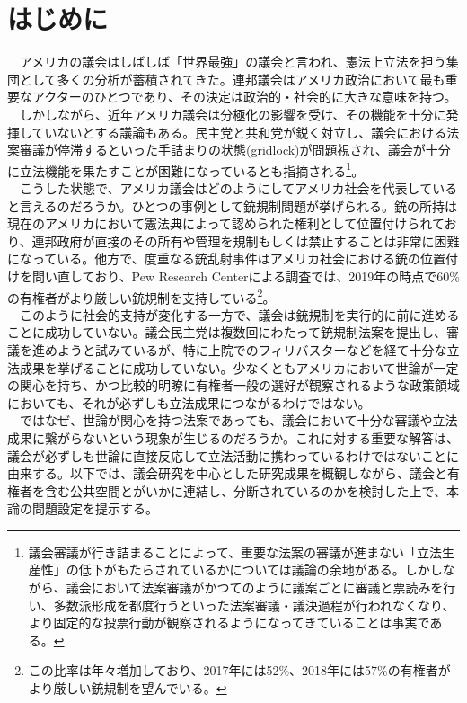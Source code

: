 \newpage
\section{はじめに}
　アメリカの議会はしばしば「世界最強」の議会\citep*{2004-cr}と言われ、憲法上立法を担う集団として多くの分析が蓄積されてきた。連邦議会はアメリカ政治において最も重要なアクターのひとつであり、その決定は政治的・社会的に大きな意味を持つ。\\
　しかしながら、近年アメリカ議会は分極化の影響を受け、その機能を十分に発揮していないとする議論もある。民主党と共和党が鋭く対立し、議会における法案審議が停滞するといった手詰まりの状態(gridlock)が問題視され、議会が十分に立法機能を果たすことが困難になっているとも指摘される\footnote{議会審議が行き詰まることによって、重要な法案の審議が進まない「立法生産性」の低下がもたらされているかについては議論の余地がある。\citep*{}しかしながら、議会において法案審議がかつてのように議案ごとに審議と票読みを行い、多数派形成を都度行うといった法案審議・議決過程が行われなくなり、より固定的な投票行動が観察されるようになってきていることは事実である。\citep*{Poole2017-ir,Layman2006-tg}}。\\
　こうした状態で、アメリカ議会はどのようにしてアメリカ社会を代表していると言えるのだろうか。ひとつの事例として銃規制問題が挙げられる。銃の所持は現在のアメリカにおいて憲法典によって認められた権利として位置付けられており、連邦政府が直接のその所有や管理を規制もしくは禁止することは非常に困難になっている。他方で、度重なる銃乱射事件はアメリカ社会における銃の位置付けを問い直しており、Pew Research Centerによる調査では、2019年の時点で60\%の有権者がより厳しい銃規制を支持している\footnote{この比率は年々増加しており、2017年には52\%、2018年には57\%の有権者がより厳しい銃規制を望んでいる。}。\citep*{Schaeffer2019-ld}\\
　このように社会的支持が変化する一方で、議会は銃規制を実行的に前に進めることに成功していない。議会民主党は複数回にわたって銃規制法案を提出し、審議を進めようと試みているが、特に上院でのフィリバスターなどを経て十分な立法成果を挙げることに成功していない。少なくともアメリカにおいて世論が一定の関心を持ち、かつ比較的明瞭に有権者一般の選好が観察されるような政策領域においても、それが必ずしも立法成果につながるわけではない。\\
　ではなぜ、世論が関心を持つ法案であっても、議会において十分な審議や立法成果に繋がらないという現象が生じるのだろうか。これに対する重要な解答は、議会が必ずしも世論に直接反応して立法活動に携わっているわけではないことに由来する。以下では、議会研究を中心とした研究成果を概観しながら、議会と有権者を含む公共空間とがいかに連結し、分断されているのかを検討した上で、本論の問題設定を提示する。\\

